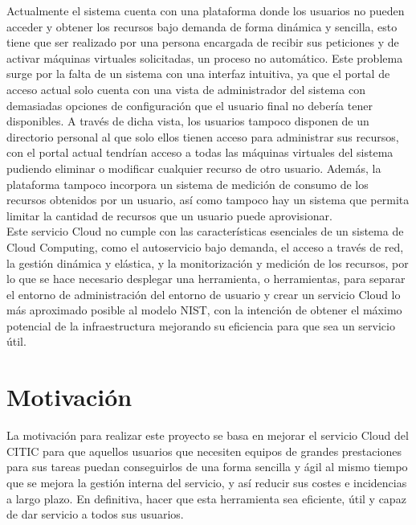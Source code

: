Actualmente el sistema cuenta con una plataforma donde los usuarios no pueden acceder y obtener los recursos bajo demanda de forma dinámica y sencilla, esto tiene que ser realizado por una persona encargada de recibir sus peticiones y de activar máquinas virtuales solicitadas, un proceso no automático. Este problema surge por la falta de un sistema con una interfaz intuitiva, ya que el portal de acceso actual solo cuenta con una vista de administrador del sistema con demasiadas opciones de configuración que el usuario final no debería tener disponibles. A través de dicha vista, los usuarios tampoco disponen de un directorio personal al que solo ellos tienen acceso para administrar sus recursos, con el portal actual tendrían acceso a todas las máquinas virtuales del sistema pudiendo eliminar o modificar cualquier recurso de otro usuario. Además, la plataforma tampoco incorpora un sistema de medición de consumo de los recursos obtenidos por un usuario, así como tampoco hay un sistema que permita limitar la cantidad de recursos que un usuario puede aprovisionar.\\

Este servicio Cloud no cumple con las características esenciales de un sistema de Cloud Computing, como el autoservicio bajo demanda, el acceso a través de red, la gestión dinámica y elástica, y la monitorización y medición de los recursos, por lo que se hace necesario desplegar una herramienta, o herramientas, para separar el entorno de administración del entorno de usuario y crear un servicio Cloud lo más aproximado posible al modelo NIST, con la intención de obtener el máximo potencial de la infraestructura mejorando su eficiencia para que sea un servicio útil.



\section{Motivación}
La motivación para realizar este proyecto se basa en mejorar el servicio Cloud del CITIC para que aquellos usuarios que necesiten equipos de grandes prestaciones para sus tareas puedan conseguirlos de una forma sencilla y ágil al mismo tiempo que se mejora la gestión interna del servicio, y así reducir sus costes e incidencias a largo plazo. En definitiva, hacer que esta herramienta sea eficiente, útil y capaz de dar servicio a todos sus usuarios.


